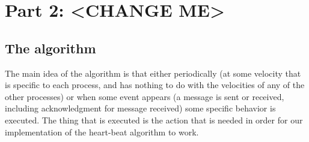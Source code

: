 \documentclass[12pt]{article}
\theoremstyle{plain}
\begin{document}
\section*{\textbf{Part 2: <CHANGE ME>}}

\subsection*{The algorithm} %
\label{sub:The algorithm}

The main idea of the algorithm is that either periodically (at some velocity
that is specific to each process, and has nothing to do with the velocities
of any of the other processes) or when some event appears (a message is sent or
received, including acknowledgment for message received) some specific behavior 
is executed. The thing that is executed is the action that is needed in order
for our implementation of the heart-beat algorithm to work. 
\end{document}
